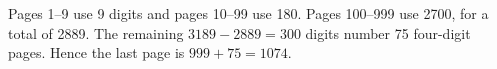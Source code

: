 Pages 1--9 use 9 digits and pages 10--99 use 180. Pages 100--999 use 2700, for a total of 2889. The remaining $3189-2889=300$ digits number 75 four-digit pages. Hence the last page is $999+75=\boxed{1074}$.
